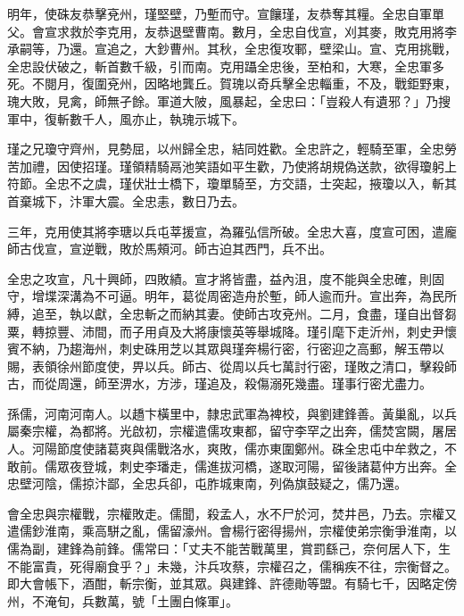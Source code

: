 \begin{pinyinscope}
 明年，使硃友恭擊兗州，瑾堅壁，乃塹而守。宣饟瑾，友恭奪其糧。全忠自軍單父。會宣求救於李克用，友恭退壁曹南。數月，全忠自伐宣，刈其麥，敗克用將李承嗣等，乃還。宣追之，大鈔曹州。其秋，全忠復攻鄆，壁梁山。宣、克用挑戰，全忠設伏破之，斬首數千級，引而南。克用躡全忠後，至柏和，大寒，全忠軍多死。不閱月，復圍兗州，因略地龔丘。賀瑰以奇兵擊全忠輜重，不及，戰鉅野東，瑰大敗，見禽，師無孑餘。軍道大陂，風暴起，全忠曰：「豈殺人有遺邪？」乃搜軍中，復斬數千人，風亦止，執瑰示城下。



 瑾之兄瓊守齊州，見勢屈，以州歸全忠，結同姓歡。全忠許之，輕騎至軍，全忠勞苦加禮，因使招瑾。瑾領精騎鬲池笑語如平生歡，乃使將胡規偽送款，欲得瓊躬上符節。全忠不之虞，瑾伏壯士橋下，瓊單騎至，方交語，士突起，掖瓊以入，斬其首棄城下，汴軍大震。全忠恚，數日乃去。



 三年，克用使其將李瑭以兵屯莘援宣，為羅弘信所破。全忠大喜，度宣可困，遣龐師古伐宣，宣逆戰，敗於馬頰河。師古迫其西門，兵不出。



 全忠之攻宣，凡十興師，四敗績。宣才將皆盡，益內沮，度不能與全忠確，則固守，增堞深溝為不可逼。明年，葛從周密造舟於塹，師人逾而升。宣出奔，為民所縛，追至，執以獻，全忠斬之而納其妻。使師古攻兗州。二月，食盡，瑾自出督芻粟，轉掠豐、沛間，而子用貞及大將康懷英等舉城降。瑾引麾下走沂州，刺史尹懷賓不納，乃趨海州，刺史硃用芝以其眾與瑾奔楊行密，行密迎之高郵，解玉帶以賜，表領徐州節度使，畀以兵。師古、從周以兵七萬討行密，瑾敗之清口，擊殺師古，而從周還，師至淠水，方涉，瑾追及，殺傷溺死幾盡。瑾事行密尤盡力。



 孫儒，河南河南人。以趫卞橫里中，隸忠武軍為裨校，與劉建鋒善。黃巢亂，以兵屬秦宗權，為都將。光啟初，宗權遣儒攻東都，留守李罕之出奔，儒焚宮闕，屠居人。河陽節度使諸葛爽與儒戰洛水，爽敗，儒亦東圍鄭州。硃全忠屯中牟救之，不敢前。儒眾夜登城，刺史李璠走，儒進拔河橋，遂取河陽，留後諸葛仲方出奔。全忠壁河陰，儒掠汴鄙，全忠兵卻，屯胙城東南，列偽旗鼓疑之，儒乃還。



 會全忠與宗權戰，宗權敗走。儒聞，殺孟人，水不尸於河，焚井邑，乃去。宗權又遣儒鈔淮南，乘高駢之亂，儒留濠州。會楊行密得揚州，宗權使弟宗衡爭淮南，以儒為副，建鋒為前鋒。儒常曰：「丈夫不能苦戰萬里，賞罰繇己，奈何居人下，生不能富貴，死得廟食乎？」未幾，汴兵攻蔡，宗權召之，儒稱疾不往，宗衡督之。即大會帳下，酒酣，斬宗衡，並其眾。與建鋒、許德勛等盟。有騎七千，因略定傍州，不淹旬，兵數萬，號「土團白條軍」。




\end{pinyinscope}
